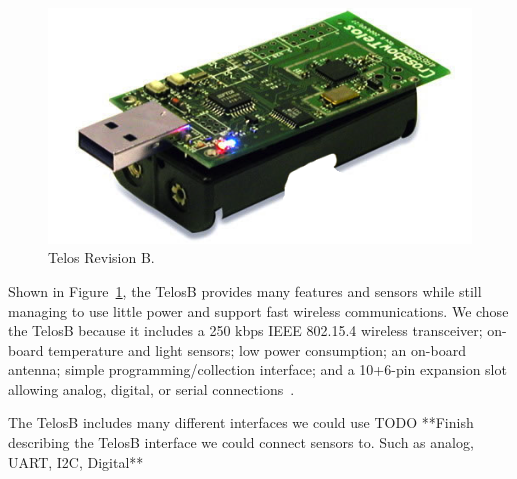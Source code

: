\documentclass{acm_proc}
\begin{document}
\begin{figure}
    \begin{center}
		\includegraphics[width=\columnwidth]{figures/telosb}
	\end{center}
	\caption{Telos Revision B.}
	\label{fig:telosb}
\end{figure}


Shown in Figure~\ref{fig:telosb}, the TelosB provides many
features and sensors while still managing to use little power and support
fast wireless communications.  We chose the TelosB because it includes a
250 kbps IEEE 802.15.4 wireless transceiver; on-board temperature and light
sensors; low power consumption; an on-board antenna; simple
programming/collection interface; and a 10+6-pin expansion slot allowing
analog, digital, or serial connections~\cite{moteiv:telosb}.

The TelosB includes many different interfaces we could use 
TODO **Finish describing the TelosB interface we could connect sensors to.  Such as analog, UART, I2C, Digital**
\end{document}
